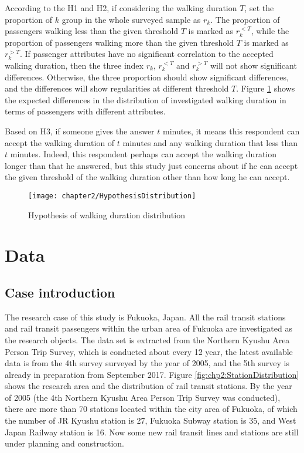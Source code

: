 According to the H1 and H2, if considering the walking duration $T$, set the proportion of $k$ group in the whole surveyed sample as $r_k$. The proportion of passengers walking less than the given threshold $T$ is marked as $r_{k}^{<T}$, while the proportion of passengers walking more than the given threshold $T$ is marked as $r_{k}^{>T}$. If passenger attributes have no significant correlation to the accepted walking duration, then the three index $r_k$, $r_{k}^{<T}$ and $r_{k}^{>T}$ will not show significant differences. Otherwise, the three proportion should show significant differences, and the differences will show regularities at different threshold $T$. Figure \ref{fig:chp2:Chp2HypothesisOfWalkingDurationDistribution} shows the expected differences in the distribution of investigated walking duration in terms of passengers with different attributes. 

Based on H3, if someone gives the answer $t$ minutes, it means this respondent can accept the walking duration of $t$ minutes and any walking duration that less than $t$ minutes. Indeed, this respondent perhaps can accept the walking duration longer than that he answered, but this study just concerns about if he can accept the given threshold of the walking duration other than how long he can accept.

\begin{figure}[htbp]
	\centering
	\texttt{[image: chapter2/HypothesisDistribution]}
	\caption{Hypothesis of walking duration distribution}
	\label{fig:chp2:Chp2HypothesisOfWalkingDurationDistribution}
\end{figure}

%
\section{Data}
%
\subsection{Case introduction}
The research case of this study is Fukuoka, Japan. All the rail transit stations and rail transit passengers within the urban area of Fukuoka are investigated as the research objects. The data set is extracted from the Northern Kyushu Area Person Trip Survey, which is conducted about every 12 year, the latest available data is from the 4th survey surveyed by the year of 2005, and the 5th survey is already in preparation from September 2017. Figure \ref{fig:chp2:StationDistribution} shows the research area and the distribution of rail transit stations. By the year of 2005 (the 4th Northern Kyushu Area Person Trip Survey was conducted), there are more than 70 stations located within the city area of Fukuoka, of which the number of JR Kyushu station is 27, Fukuoka Subway station is 35, and West Japan Railway station is 16. Now some new rail transit lines and stations are still under planning and construction. 

